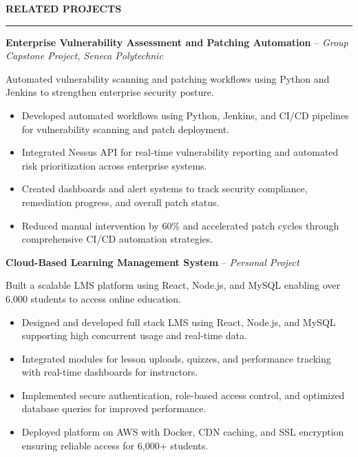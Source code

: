 \documentclass[10pt,letterpaper]{article}
\begin{document}
\vspace{6pt}

\textbf{RELATED PROJECTS}\\[-8pt]
\noindent\rule{\textwidth}{1pt}

\vspace{-2pt}

\textbf{Enterprise Vulnerability Assessment and Patching Automation} -- \emph{Group Capstone Project, Seneca Polytechnic}

\vspace{-1pt}

Automated vulnerability scanning and patching workflows using Python and Jenkins to strengthen enterprise security posture.
\vspace{-1pt}
\begin{itemize}
\item Developed automated workflows using Python, Jenkins, and CI/CD pipelines for vulnerability scanning and patch deployment.
\item Integrated Nessus API for real-time vulnerability reporting and automated risk prioritization across enterprise systems.
\item Created dashboards and alert systems to track security compliance, remediation progress, and overall patch status.
\item Reduced manual intervention by 60\% and accelerated patch cycles through comprehensive CI/CD automation strategies.
\end{itemize}

\textbf{Cloud-Based Learning Management System} -- \emph{Personal Project}

\vspace{-1pt}

Built a scalable LMS platform using React, Node.js, and MySQL enabling over 6,000 students to access online education.
\vspace{-1pt}
\begin{itemize}
\item Designed and developed full stack LMS using React, Node.js, and MySQL supporting high concurrent usage and real-time data.
\item Integrated modules for lesson uploads, quizzes, and performance tracking with real-time dashboards for instructors.
\item Implemented secure authentication, role-based access control, and optimized database queries for improved performance.
\item Deployed platform on AWS with Docker, CDN caching, and SSL encryption ensuring reliable access for 6,000+ students.
\end{itemize}
\end{document}
